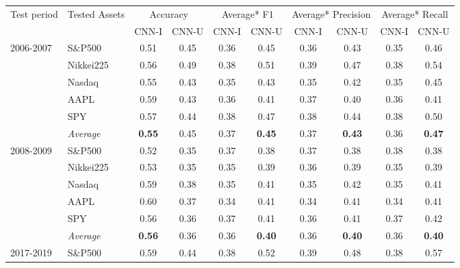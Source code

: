 \documentclass[12pt, a4paper]{article}
\begin{document}
\begin{table}[H]
\begin{tabular}{l|l|cc|cc|cc|cc}
\multicolumn{1}{m{1cm}|}{\multirow{2}{1cm}{Test period}} & \multicolumn{1}{m{1.5cm}|}{\multirow{2}{1.5cm}{Tested Assets}} & \multicolumn{2}{c|}{Accuracy} & \multicolumn{2}{c|}{Average* F1} & \multicolumn{2}{c|}{Average* Precision} & \multicolumn{2}{c}{Average* Recall}  \\
\cline{3-10}
&& CNN-I & CNN-U & CNN-I & CNN-U & CNN-I & CNN-U & CNN-I & CNN-U \\ \hline \hline
\multirow{6}{1cm}{2006-2007} & S\&P500          & 0.51          & 0.45 & 0.36 & 0.45          & 0.36 & 0.43          & 0.35 & 0.46          \\
& Nikkei225        & 0.56          & 0.49 & 0.38 & 0.51          & 0.39 & 0.47          & 0.38 & 0.54          \\
& Nasdaq           & 0.55          & 0.43 & 0.35 & 0.43          & 0.35 & 0.42          & 0.35 & 0.45          \\
& AAPL             & 0.59          & 0.43 & 0.36 & 0.41          & 0.37 & 0.40          & 0.36 & 0.41          \\
& SPY              & 0.57          & 0.44 & 0.38 & 0.47          & 0.38 & 0.44          & 0.38 & 0.50          \\ \cline{2-10}
& \textit{Average} & \textbf{0.55} & 0.45 & 0.37 & \textbf{0.45} & 0.37 & \textbf{0.43} & 0.36 & \textbf{0.47} \\ \hline
\multirow{6}{1cm}{2008-2009} & S\&P500          & 0.52          & 0.35 & 0.37 & 0.38          & 0.37 & 0.38          & 0.38 & 0.38          \\
          & Nikkei225        & 0.53          & 0.35 & 0.35 & 0.39          & 0.36 & 0.39          & 0.35 & 0.39          \\
          & Nasdaq           & 0.59          & 0.38 & 0.35 & 0.41          & 0.35 & 0.42          & 0.35 & 0.41          \\
          & AAPL             & 0.60          & 0.37 & 0.34 & 0.41          & 0.34 & 0.41          & 0.34 & 0.41          \\
          & SPY              & 0.56          & 0.36 & 0.37 & 0.41          & 0.36 & 0.41          & 0.37 & 0.42          \\ \cline{2-10} 
          & \textit{Average} & \textbf{0.56} & 0.36 & 0.36 & \textbf{0.40} & 0.36 & \textbf{0.40} & 0.36 & \textbf{0.40} \\ \hline
\multirow{6}{1cm}{2017-2019} & S\&P500          & 0.59          & 0.44 & 0.38 & 0.52          & 0.39 & 0.48          & 0.38 & 0.57          \\

\end{tabular}
\end{table}
\end{document}
